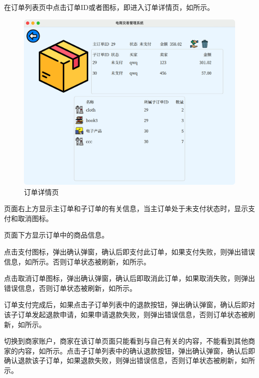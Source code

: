 \documentclass[lang=cn,11pt,a4paper,cite=authornum]{paper}
\begin{document}
在订单列表页中点击订单ID或者图标，即进入订单详情页，如所示。

\begin{figure}[htbp]
    \centering
    \includegraphics[width=0.7\linewidth]{./Images/orderunpaid.png}
    \caption{订单详情页\label{fig:orderunpaid}}
\end{figure}

页面右上方显示主订单和子订单的有关信息，当主订单处于未支付状态时，显示支付和取消图标。

页面下方显示订单中的商品信息。

点击支付图标，弹出确认弹窗，确认后即支付此订单，如果支付失败，则弹出错误信息，如所示。否则订单状态被刷新，如所示。

点击取消订单图标，弹出确认弹窗，确认后即取消此订单，如果取消失败，则弹出错误信息，否则订单状态被刷新，如所示。

订单支付完成后，如果点击子订单列表中的退款按钮，弹出确认弹窗，确认后即对该子订单发起退款申请，如果申请退款失败，则弹出错误信息，否则订单状态被刷新，如所示。

切换到商家账户，商家在该订单页面只能看到与自己有关的内容，不能看到其他商家的内容，如所示。点击子订单列表中的确认退款按钮，弹出确认弹窗，确认后即确认退款该子订单，如果退款失败，则弹出错误信息，否则订单状态被刷新，如所示。
\end{document}
